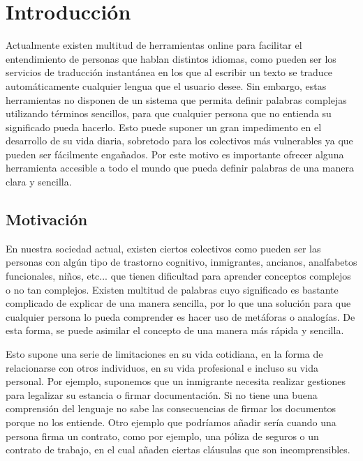 \chapter{Introducción}
\label{cap:introduccion}


Actualmente existen multitud de herramientas online para facilitar el entendimiento de personas que hablan distintos idiomas, como pueden ser los servicios de traducción instantánea en los que al escribir un texto se traduce automáticamente cualquier lengua que el usuario desee. Sin embargo, estas herramientas no disponen de un sistema que permita definir palabras complejas utilizando términos sencillos, para que cualquier persona que no entienda su significado pueda hacerlo. Esto puede suponer un gran impedimento en el desarrollo de su vida diaria, sobretodo para los colectivos más vulnerables ya que pueden ser fácilmente engañados.
Por este motivo es importante ofrecer alguna herramienta accesible a todo el mundo que pueda definir palabras de una manera clara y sencilla.

	


\section{Motivación}
\label{cap:sec:motivacion}

En nuestra sociedad actual, existen ciertos colectivos como pueden ser las personas con algún tipo de trastorno cognitivo, inmigrantes, ancianos, analfabetos funcionales, niños, etc... que tienen dificultad para aprender conceptos complejos o no tan complejos. 
Existen multitud de palabras cuyo significado es bastante complicado de explicar de una manera sencilla, por lo que una solución para que cualquier persona lo pueda comprender es hacer uso de metáforas o analogías. De esta forma, se puede asimilar el concepto de una manera más rápida y sencilla. 

Esto supone una serie de limitaciones en su vida cotidiana, en la forma de relacionarse con otros individuos, en su vida profesional e incluso su vida personal. Por ejemplo, suponemos que un inmigrante necesita realizar gestiones para legalizar su estancia o firmar documentación. Si no tiene una buena comprensión del lenguaje no sabe las consecuencias de firmar los documentos porque no los entiende. 
Otro ejemplo que podríamos añadir sería cuando una persona firma un contrato, como por ejemplo, una póliza de seguros o un contrato de trabajo, en el cual añaden ciertas cláusulas que son incomprensibles. 


